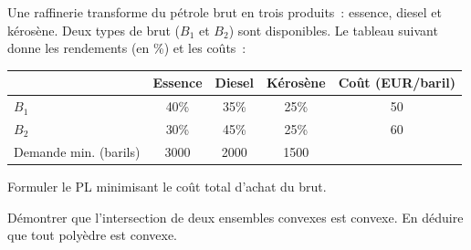 \begin{exercice}
Une raffinerie transforme du p\'etrole brut en trois produits~: essence,
diesel et k\'eros\`ene.  Deux types de brut ($B_1$ et $B_2$) sont disponibles.
Le tableau suivant donne les rendements (en \%) et les co\^uts~:

\begin{center}
\begin{tabular}{lccc|c}
  \toprule
  & Essence & Diesel & K\'eros\`ene & Co\^ut (EUR/baril) \\
  \midrule
  $B_1$ & 40\% & 35\% & 25\% & 50 \\
  $B_2$ & 30\% & 45\% & 25\% & 60 \\
  \midrule
  Demande min. (barils) & 3000 & 2000 & 1500 & \\
  \bottomrule
\end{tabular}
\end{center}

Formuler le PL minimisant le co\^ut total d'achat du brut.
\end{exercice}

\begin{exercice}
D\'emontrer que l'intersection de deux ensembles convexes est convexe.
En d\'eduire que tout poly\`edre est convexe.
\end{exercice}
